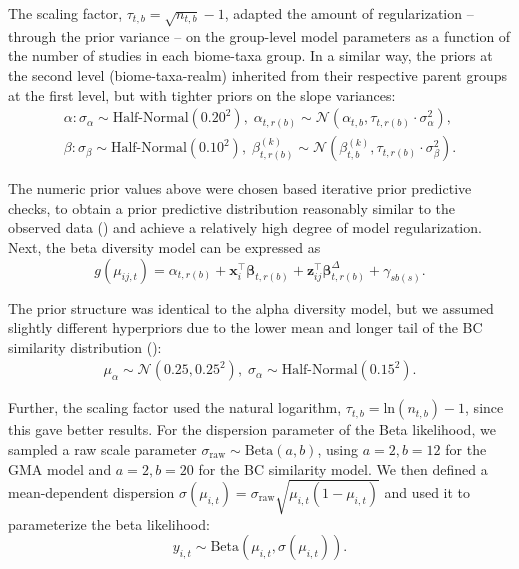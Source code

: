 The scaling factor, $\tau_{t,b} = \sqrt{n_{t,b}} -1$, adapted the amount of regularization -- through the prior variance -- on the group-level model parameters as a function of the number of studies in each biome-taxa group. In a similar way, the priors at the second level (biome-taxa-realm) inherited from their respective parent groups at the first level, but with tighter priors on the slope variances:
\vspace{0.25\baselineskip}
\begin{equation*}
\begin{gathered}
    \alpha: \sigma_{\alpha} \sim \text{Half-Normal}(0.20^2), \; \alpha_{t,r(b)} \sim \mathcal{N}(\alpha_{t,b}, \tau_{t,r(b)} \cdot \sigma_{\alpha}^2), \\
    \beta: \sigma_{\beta} \sim \text{Half-Normal}(0.10^2), \; \beta_{t,r(b)}^{(k)} \sim \mathcal{N}(\beta_{t,b}^{(k)}, \tau_{t,r(b)} \cdot \sigma_{\beta}^2).
\end{gathered}
\end{equation*}

The numeric prior values above were chosen based iterative prior predictive checks, to obtain a prior predictive distribution reasonably similar to the observed data () and achieve a relatively high degree of model regularization. Next, the beta diversity model can be expressed as
\vspace{0.25\baselineskip}
\begin{equation*}
    g(\mu_{ij,t}) = \alpha_{t,r(b)} + \mathbf{x}_i^\top \boldsymbol{\beta}_{t,r(b)} +\mathbf{z}_{ij}^\top \boldsymbol{\beta}_{t,r(b)}^\Delta + \gamma_{sb(s)}.
\end{equation*}

The prior structure was identical to the alpha diversity model, but we assumed slightly different hyperpriors due to the lower mean and longer tail of the BC similarity distribution ():
\vspace{0.25\baselineskip}
\begin{equation*}
\begin{aligned}
    \mu_{\alpha} \sim \mathcal{N}(0.25, 0.25^2), \; \sigma_{\alpha} \sim \text{Half-Normal}(0.15^2).
\end{aligned}
\end{equation*}

Further, the scaling factor used the natural logarithm, $\tau_{t,b} = \text{ln}(n_{t,b}) -1$, since this gave better results. For the dispersion parameter of the Beta likelihood, we sampled a raw scale
parameter $\sigma_{\mathrm{raw}} \sim \mathrm{Beta}(a,b)$, using $a=2,b=12$ for
the GMA model and $a=2,b=20$ for the BC similarity model. We then defined a mean-dependent dispersion
$\sigma(\mu_{i,t}) = \sigma_{\mathrm{raw}} \sqrt{\mu_{i,t}\left(1-\mu_{i,t}\right)}$ and used it to parameterize the beta likelihood:
\begin{equation*}
    y_{i,t} \sim \mathrm{Beta}\!\left(\mu_{i,t}, \sigma(\mu_{i,t})\right).
\end{equation*}

